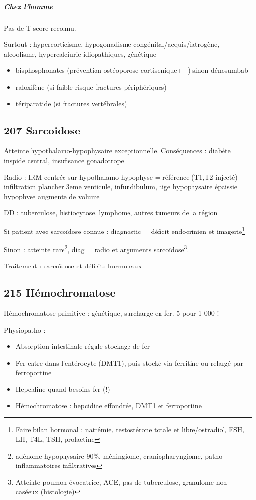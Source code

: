 \documentclass[11pt]{article}
\begin{document}
\subparagraph{Chez l'homme}
\label{sec:orgf784900}
Pas de T-score reconnu. 

Surtout : hypercorticisme, hypogonadisme congénital/acquis/iatrogène, alcoolisme, hypercalciurie
idiopathiques, génétique

\begin{tcolorbox}
\begin{itemize}
\item bisphosphonates (prévention ostéoporose cortisonique++) sinon dénosumbab 
\item raloxifène (si faible risque fractures périphériques)
\item tériparatide (si  fractures vertébrales)
\end{itemize}
\end{tcolorbox}

\subsection{207 \textdagger{} Sarcoidose}
\label{sec:orgea7d671}
Atteinte hypothalamo-hypophysaire exceptionnelle. Conséquences : diabète
inspide central, insufisance gonadotrope

Radio : IRM centrée sur hypothalamo-hypophyse = référence (T1,T2 injecté) \thus
infiltration plancher 3eme venticule, infundibulum, tige hypophysaire épaissie
\textpm{} hypophyse augmente de volume

DD : tuberculose, histiocytose, lymphome, autres tumeurs de la région 

Si patient avec sarcoïdose connue : diagnostic = déficit endocrinien et imagerie\footnote{Faire bilan hormonal : natrémie, testostérone totale et libre/ostradiol,
FSH, LH, T4L, TSH, prolactine}

Sinon : atteinte rare\footnote{adénome hypophysaire 90\%, méningiome, craniopharyngiome, patho
inflammatoires infiltratives}, diag = radio et arguments sarcoïdose\footnote{Atteinte poumon évocatrice, \inc{} ACE, pas de tuberculose, granulome
non caséeux (histologie)}.

Traitement : sarcoïdose et déficits hormonaux

\subsection{215 \textdagger{} Hémochromatose}
\label{sec:org52d10da}
Hémochromatose primitive : génétique, surcharge en fer. 5 pour 1 000 !

Physiopatho : 
\begin{itemize}
\item Absorption intestinale régule stockage de fer
\item Fer entre dans l'entérocyte (DMT1), puis stocké via ferritine ou relargé par ferroportine
\item Hepcidine \dec quand besoins fer \inc (!)
\item Hémochromatose : hepcidine effondrée, DMT1 et ferroportine \inc
\end{itemize}
\end{document}
